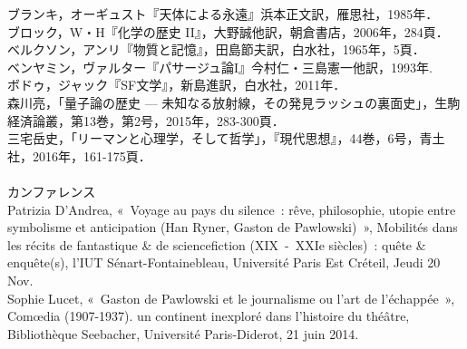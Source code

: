 ブランキ，オーギュスト『天体による永遠』浜本正文訳，雁思社，1985年．\\
ブロック，W・H『化学の歴史 II』，大野誠他訳，朝倉書店，2006年，284頁．\\
ベルクソン，アンリ『物質と記憶』，田島節夫訳，白水社，1965年，5頁．\\
ベンヤミン，ヴァルター『パサージュ論I』今村仁・三島憲一他訳，1993年.\\
ボドゥ，ジャック『SF文学』，新島進訳，白水社，2011年．\\
森川亮，「量子論の歴史 --- 未知なる放射線，その発見ラッシュの裏面史」，生駒経済論叢，第13巻，第2号，2015年，283-300頁．\\
三宅岳史，「リーマンと心理学，そして哲学」，『現代思想』，44巻，6号，青土社，2016年，161-175頁．\\
\\
{\large カンファレンス}\\
Patrizia D’Andrea, «~Voyage au pays du silence~: rêve, philosophie, utopie entre symbolisme et anticipation (Han Ryner, Gaston de Pawlowski)~», Mobilités dans les récits de fantastique \& de science­fiction (XIX~-~XXIe siècles)~: quête \& enquête(s), l'IUT Sénart-Fontainebleau, Université Paris Est Créteil, Jeudi 20 Nov.\\
Sophie Lucet, «~Gaston de Pawlowski et le journalisme ou l’art de l’échappée~», Comœdia (1907-1937). un continent inexploré dans l'histoire du théâtre, Bibliothèque Seebacher, Université Paris-Diderot, 21 juin 2014. \\
